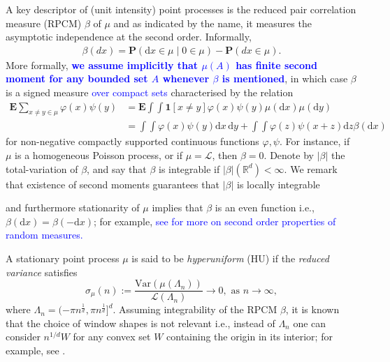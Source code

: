 \documentclass[12pt]{article}
\newcommand{\Leb}{\mathcal{L}}
\newcommand{\1}{\mathbf{1}}
\newcommand{\md}{\mathrm{d}}
\newcommand{\var}{\text{Var}}
\newcommand{\RL}[1]{\textcolor{blue}{#1}}
\newcommand{\dy}[1]{\textcolor{blue}{#1}}
\newcommand{\RL}[1]{#1}%
\newcommand{\dy}[1]{#1}%
\begin{document}
{A key descriptor of (unit intensity) point processes is the reduced pair correlation measure (RPCM) $ \beta $ of $ \mu $ {and as indicated by the name, it measures the asymptotic independence at the second order. Informally,}
%
\begin{align*}\beta (dx) = \mathbf{P}(\md x\in \mu \;|\;0\in \mu )-\mathbf{P}(dx\in \mu ).
\end{align*}
%
More formally, \dy{{\bf we assume implicitly that $\mu (A)$ has finite second moment for any bounded set $A$ whenever $ \beta $ is mentioned}}, in which case $ \beta $ is a signed measure \RL{over compact sets} characterised by the relation
\begin{align}
\mathbf{E}\sum_{x\neq y\in \mu }\varphi (x)\psi (y) &=  {\mathbf{E} \int \int \1[x \neq y]\varphi (x)\psi (y)\mu(\md x)\mu(\md y)}   \nonumber \\
& = \int \int \varphi (x)\psi (y)\md x \, \md y + \int \int \varphi (z)\psi (x + z) \md z \beta (\md x)\label{eq:def-beta}
\end{align}
for  non-negative compactly supported continuous functions $ \varphi ,\psi $. For instance, if $ \mu $ is a homogeneous Poisson process, or if $ \mu  = \Leb$, then $ \beta  = 0.$ Denote by $| \beta |$ the total-variation of $ \beta $, and say that $ \beta $ is integrable if $  | \beta  | (\mathbb{R}^{d})<\infty .$ We remark that existence of second moments guarantees that  $| \beta  |$ is locally integrable {and furthermore stationarity of $\mu$ implies that $\beta$ is an even function i.e., $\beta(\md x) = \beta(-\md x)$; for example, \dy{see \cite[Section 8]{DvJ08} for more on second order properties of random measures.}

 {A stationary point process $\mu$ is said to be {\it hyperuniform} (HU) if the {\it reduced variance} satisfies}
%
\begin{equation}
\label{e:sigman}
\sigma_{\mu}(n) := \frac{\var(\mu (\Lambda _{n}))}{\Leb(\Lambda _{n})} \to 0, \, \, \textrm{as $n \to \infty$},
\end{equation}
%
where $\Lambda_n = (-\pi n^{\frac{1}{d}},\pi n^{\frac{1}{d}}]^d$. Assuming integrability of the RPCM $\beta$, it is known that the choice of window shapes is not relevant i.e., instead of $\Lambda_n$ one can consider $n^{1/d}W$ for any convex set $W$ containing the origin in its interior; for example, see  \cite[Proposition 2.2]{coste2021order}.

}}
\end{document}
